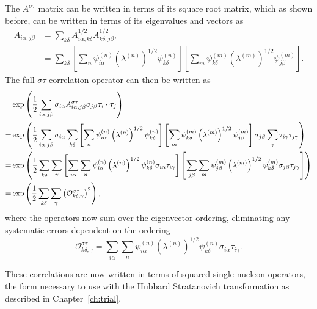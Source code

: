 The $A^{\sigma\tau}$ matrix can be written in terms of its square root matrix, which as shown before, can be written in terms of its eigenvalues and vectors as
\begin{align}
   A_{i\alpha,j\beta} &= \sum\limits_{k\delta} A^{1/2}_{i\alpha,k\delta}A^{1/2}_{k\delta,j\beta}, \\
      &= \sum\limits_{k\delta} \left[\sum\limits_n \psi_{i\alpha}^{(n)}\left(\lambda^{(n)}\right)^{1/2}\psi_{k\delta}^{(n)}\right] \left[\sum\limits_m \psi_{k\delta}^{(m)}\left(\lambda^{(m)}\right)^{1/2}\psi_{j\beta}^{(m)}\right].
\end{align}
The full $\sigma\tau$ correlation operator can then be written as
\begin{align}
   &\exp\left(\frac{1}{2}\sum\limits_{i\alpha,j\beta} \sigma_{i\alpha}A^{\sigma\tau}_{i\alpha,j\beta}\sigma_{j\beta}\bm{\tau}_i\cdot\bm{\tau}_j\right) \\
   =&\exp\left(\frac{1}{2}\sum\limits_{i\alpha,j\beta} \sigma_{i\alpha} \sum\limits_{k\delta} \left[\sum\limits_n \psi_{i\alpha}^{(n)}\left(\lambda^{(n)}\right)^{1/2}\psi_{k\delta}^{(n)}\right] \left[\sum\limits_m \psi_{k\delta}^{(m)}\left(\lambda^{(m)}\right)^{1/2}\psi_{j\beta}^{(m)}\right] \sigma_{j\beta}\sum\limits_\gamma\tau_{i\gamma}\tau_{j\gamma}\right) \\
   =&\exp\left(\frac{1}{2}\sum\limits_{k\delta}\sum\limits_\gamma \left[\sum\limits_{i\alpha}\sum\limits_n \psi_{i\alpha}^{(n)}\left(\lambda^{(n)}\right)^{1/2}\psi_{k\delta}^{(n)}\sigma_{i\alpha}\tau_{i\gamma}\right] \left[\sum\limits_{j\beta}\sum\limits_m \psi_{j\beta}^{(m)}\left(\lambda^{(m)}\right)^{1/2}\psi_{k\delta}^{(m)}\sigma_{j\beta}\tau_{j\gamma}\right] \right) \\
   =& \exp\left(\frac{1}{2}\sum\limits_{k\delta}\sum\limits_\gamma\left(\mathcal{O}^{\sigma\tau}_{k\delta,\gamma}\right)^2 \right),
\end{align}
where the operators now sum over the eigenvector ordering, eliminating any systematic errors dependent on the ordering
\begin{equation}
   \mathcal{O}^{\sigma\tau}_{k\delta,\gamma} = \sum\limits_{i\alpha}\sum\limits_n \psi_{i\alpha}^{(n)}\left(\lambda^{(n)}\right)^{1/2}\psi_{k\delta}^{(n)}\sigma_{i\alpha}\tau_{i\gamma}.
\end{equation}

These correlations are now written in terms of squared single-nucleon operators, the form necessary to use with the Hubbard Stratanovich transformation as described in Chapter~\ref{ch:trial}.
